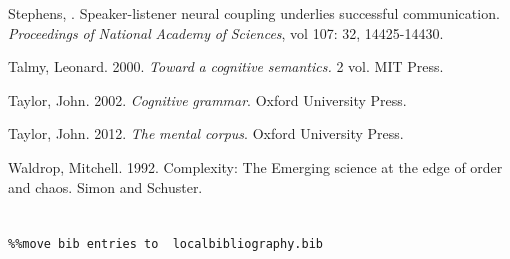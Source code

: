 \begin{stylereferences}
Stephens, \citealt{GregEtAl2010}. Speaker-listener neural coupling underlies successful communication. \textit{Proceedings} \textit{of} \textit{National} \textit{Academy} \textit{of} \textit{Sciences}, vol 107: 32, 14425-14430.
\end{stylereferences}

\begin{stylereferences}
Talmy, Leonard. 2000. \textit{Toward} \textit{a} \textit{cognitive} \textit{semantics.} 2 vol. MIT Press.
\end{stylereferences}

\begin{stylereferences}
Taylor, John. 2002. \textit{Cognitive} \textit{grammar}. Oxford University Press.
\end{stylereferences}

\begin{stylereferences}
Taylor, John. 2012. \textit{The} \textit{mental} \textit{corpus}. Oxford University Press.
\end{stylereferences}

\begin{stylereferences}
Waldrop, Mitchell. 1992. Complexity: The Emerging science at the edge of order and chaos. Simon and Schuster. 
\end{stylereferences}
\chapter{}

\begin{verbatim}%%move bib entries to  localbibliography.bib
\end{verbatim} 